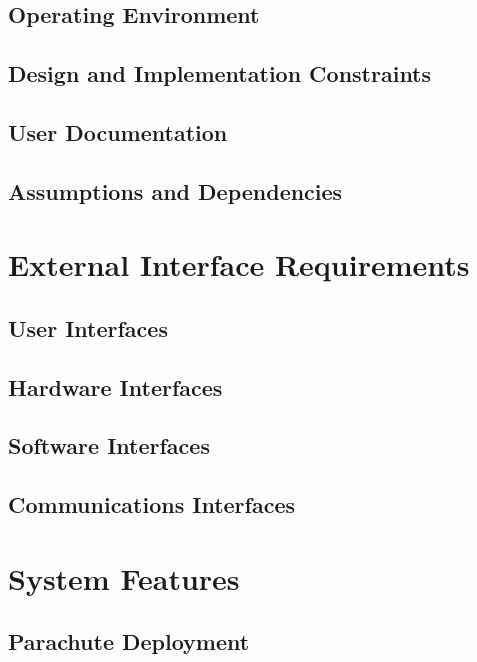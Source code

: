 \documentclass{scrreprt}
\begin{document}
\section{Operating Environment}


\section{Design and Implementation Constraints}


\section{User Documentation}


\section{Assumptions and Dependencies}




\chapter{External Interface Requirements}

\section{User Interfaces}


\section{Hardware Interfaces}


\section{Software Interfaces}


\section{Communications Interfaces}



\chapter{System Features}


\section{Parachute Deployment}
\end{document}
